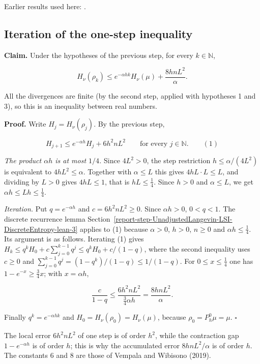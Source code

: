 \documentclass[11pt,a4paper]{report}
\begin{document}
Earlier results used here: \cite[Section~3.26.3]{LangevinLean2026ULASC}.
\subsection{\texorpdfstring{Iteration of the one-step inequality}{Iteration of the one-step inequality}}
\label{report-step-UnadjustedLangevin-LSI-Theorem-lean-4}


\textbf{Claim.} Under the hypotheses of the previous step, for every \(k\in\mathbb N\),


\[H_\nu(\rho_k)\le e^{-\alpha hk}H_\nu(\mu)+\frac{8hnL^2}{\alpha}.\]


All the divergences are finite (by the second step, applied with hypotheses 1 and 3), so this is an inequality between real numbers.




\textbf{Proof.} Write \(H_j=H_\nu(\rho_j)\). By the previous step,


\[H_{j+1}\le e^{-\alpha h}H_j+6h^2nL^2\qquad\text{for every }j\in\mathbb N.\qquad(1)\]


\emph{The product \(\alpha h\) is at most \(1/4\).} Since \(4L^2>0\), the step restriction \(h\le\alpha/(4L^2)\) is equivalent to \(4hL^2\le\alpha\). Together with \(\alpha\le L\) this gives \(4hL\cdot L\le L\), and dividing by \(L>0\) gives \(4hL\le1\), that is \(hL\le\frac14\). Since \(h>0\) and \(\alpha\le L\), we get \(\alpha h\le Lh\le\frac14\).




\emph{Iteration.} Put \(q=e^{-\alpha h}\) and \(c=6h^2nL^2\ge0\). Since \(\alpha h>0\), \(0<q<1\). The discrete recurrence lemma Section~\ref{report-step-UnadjustedLangevin-LSI-DiscreteEntropy-lean-3} applies to (1) because \(\alpha>0\), \(h>0\), \(n\ge0\) and \(\alpha h\le\frac14\). Its argument is as follows. Iterating (1) gives \(H_k\le q^kH_0+c\sum_{j=0}^{k-1}q^j\le q^kH_0+c/(1-q)\), where the second inequality uses \(c\ge0\) and \(\sum_{j=0}^{k-1}q^j=(1-q^k)/(1-q)\le1/(1-q)\). For \(0\le x\le\frac14\) one has \(1-e^{-x}\ge\frac34x\); with \(x=\alpha h\),


\[\frac{c}{1-q}\le\frac{6h^2nL^2}{\frac34\alpha h}=\frac{8hnL^2}{\alpha}.\]


Finally \(q^k=e^{-\alpha hk}\) and \(H_0=H_\nu(\rho_0)=H_\nu(\mu)\), because \(\rho_0=P_h^0\mu=\mu\). \(\square\)




The local error \(6h^2nL^2\) of one step is of order \(h^2\), while the contraction gap \(1-e^{-\alpha h}\) is of order \(h\); this is why the accumulated error \(8hnL^2/\alpha\) is of order \(h\). The constants \(6\) and \(8\) are those of Vempala and Wibisono (2019).
\end{document}
